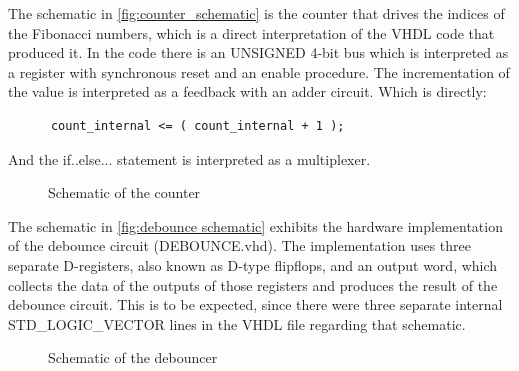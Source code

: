 \documentclass[10pt]{article}
\begin{document}
The schematic in \autoref{fig:counter_schematic} is the counter that drives the indices of the Fibonacci numbers, which is a direct interpretation of the VHDL code that produced it. In the code there is an UNSIGNED 4-bit bus which is interpreted as a register with synchronous reset and an enable procedure. The incrementation of the value is interpreted as a feedback with an adder circuit. Which is directly:
\begin{verbatim}
      count_internal <= ( count_internal + 1 );
\end{verbatim}
And the if..else... statement is interpreted as a multiplexer.
\begin{figure}[ht]
    \centering
    \caption{Schematic of the counter}
    \label{fig:counter_schematic}
\end{figure}

The schematic in \autoref{fig:debounce schematic} exhibits the hardware implementation of the debounce circuit (DEBOUNCE.vhd). The implementation uses three separate D-registers, also known as D-type flipflops, and an output word, which collects the data of the outputs of those registers and produces the result of the debounce circuit. This is to be expected, since there were three separate internal STD\_LOGIC\_VECTOR lines in the VHDL file regarding that schematic.

\begin{figure}[ht]
    \centering
    \caption{Schematic of the debouncer}
    \label{fig:debounce schematic}
\end{figure}
\newpage
\end{document}
